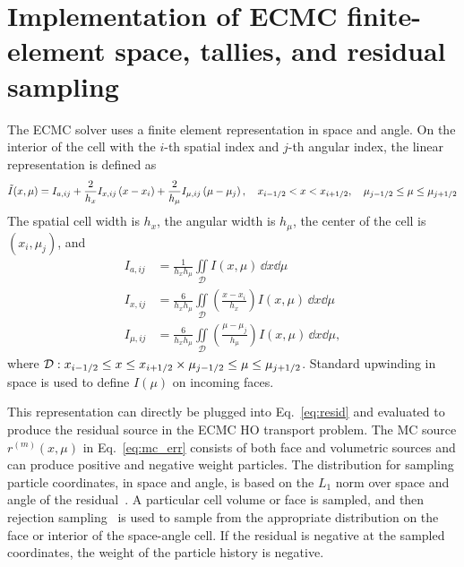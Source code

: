 \section{Implementation of ECMC finite-element space, tallies, and residual sampling}
\label{app:tallies}

The ECMC solver uses a finite element representation in space and angle. On the
interior of the cell with the $i$-th spatial index and $j$-th angular index, the linear representation is defined as
\begin{equation*}
    \tilde I(x,\mu) = I_{a,ij} + \frac{2}{h_x}I_{x,ij}\left(x-x_i\right) +
    \frac{2}{h_\mu}I_{\mu,ij}\left(\mu-\mu_j\right), \quad x_{{i-1/2}} <  x < x_{{i+1/2}},\quad
     \mu_{j-1/2} \leq \mu \leq \mu_{j+1/2}
\end{equation*}
The spatial cell width is $h_x$, the angular width is
$h_\mu$, the center of the cell is $(x_i,\mu_j)$, and
\begin{align}\label{app1}
    I_{a,ij} &= \frac{1}{h_x h_\mu} \iint\limits_{\mathcal{D}} I(x,\mu)\, \dd x \dd \mu \\
    I_{x,ij} &= \frac{6}{h_xh_\mu}\iint\limits_{\mathcal{D}} \left(\frac{x - x_i}{h_{x}}\right)
    I(x,\mu)\, \dd x \dd \mu \\ \label{app2}
    I_{\mu,ij} &= \frac{6}{h_xh_\mu}\iint\limits_{\mathcal{D}}
     \left(\frac{\mu - \mu_j}{h_{\mu}}\right)
    I(x,\mu)\, \dd x \dd \mu,
\end{align}
where $\mathcal{D}: x_{{i-1/2}} \leq  x \leq  x_{{i+1/2}} \times \mu_{j-1/2} \leq \mu \leq \mu_{j+1/2}$.
Standard upwinding in space is used to
define $I(\mu)$ on incoming faces. 

This representation can directly be plugged into
Eq.~\eqref{eq:resid} and evaluated to produce the residual source in the ECMC HO transport
problem.  The MC source $r^{(m)}(x,\mu)$ in Eq.~\eqref{eq:mc_err}
consists of both face and volumetric sources and can produce positive and
negative weight particles.  The distribution for sampling particle coordinates, in space and angle, is based on the $L_1$
norm over space and angle of the residual~\cite{jake}.  A particular cell volume or face 
is sampled, and then rejection sampling~\cite{shultis_mc} is used to sample from
the appropriate distribution on the face or interior of the space-angle cell.  If the
residual is negative at the sampled coordinates, the weight of the particle history is negative.


